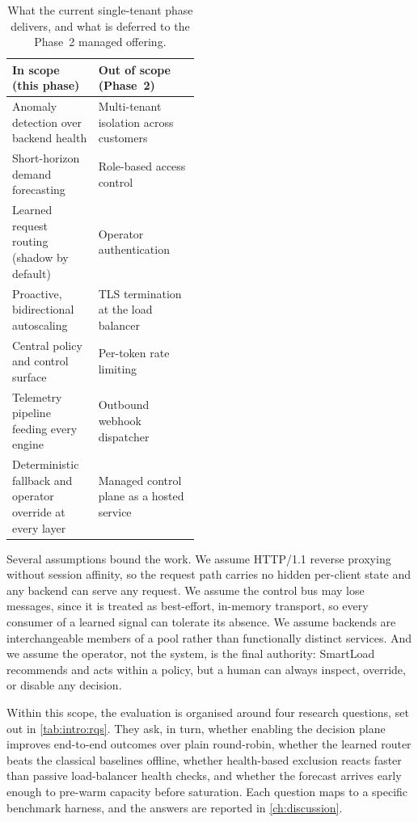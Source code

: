 \begin{table}[H]
  \centering
  \caption[Single-tenant scope versus Phase 2 deferrals]{What the current single-tenant phase delivers, and what is deferred to the Phase~2 managed offering.}
  \label{tab:intro:scope}
  \small
  \begin{tabularx}{\linewidth}{@{}>{\raggedright\arraybackslash}p{0.46\linewidth}Y@{}}
    \toprule
    \headrow
    \textbf{In scope (this phase)} & \textbf{Out of scope (Phase~2)} \\
    \midrule
    Anomaly detection over backend health & Multi-tenant isolation across customers \\
    Short-horizon demand forecasting       & Role-based access control \\
    Learned request routing (shadow by default) & Operator authentication \\
    Proactive, bidirectional autoscaling   & TLS termination at the load balancer \\
    Central policy and control surface     & Per-token rate limiting \\
    Telemetry pipeline feeding every engine & Outbound webhook dispatcher \\
    Deterministic fallback and operator override at every layer & Managed control plane as a hosted service \\
    \bottomrule
  \end{tabularx}
\end{table}

Several assumptions bound the work. We assume HTTP/1.1 reverse proxying without
session affinity, so the request path carries no hidden per-client state and any
backend can serve any request. We assume the control bus may lose messages, since
it is treated as best-effort, in-memory transport, so every consumer of a learned
signal can tolerate its absence. We assume backends are interchangeable members
of a pool rather than functionally distinct services. And we assume the operator,
not the system, is the final authority: SmartLoad recommends and acts within a
policy, but a human can always inspect, override, or disable any decision.

Within this scope, the evaluation is organised around four research questions, set
out in \cref{tab:intro:rqs}. They ask, in turn, whether enabling the decision
plane improves end-to-end outcomes over plain round-robin, whether the learned
router beats the classical baselines offline, whether health-based exclusion
reacts faster than passive load-balancer health checks, and whether the forecast
arrives early enough to pre-warm capacity before saturation. Each question maps to
a specific benchmark harness, and the answers are reported in
\cref{ch:discussion}.

